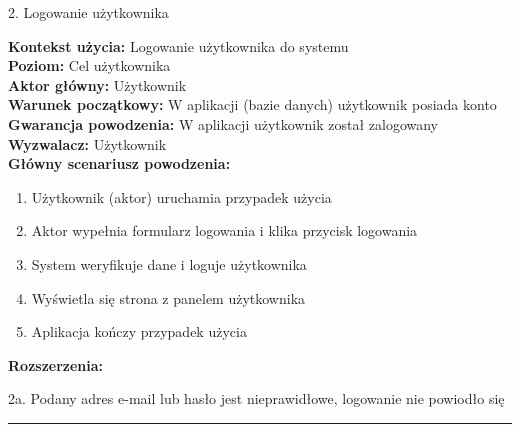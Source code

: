 {\noindent \bf{\large 2. Logowanie użytkownika\par}}
\vspace{0.5cm}
{\noindent \bf Kontekst użycia: } Logowanie użytkownika do systemu\\
{\bf Poziom: } Cel użytkownika\\
{\bf Aktor główny: } Użytkownik\\
{\bf Warunek początkowy: } W aplikacji (bazie danych) użytkownik posiada konto\\
{\bf Gwarancja powodzenia: } W aplikacji użytkownik został zalogowany\\
{\bf Wyzwalacz: } Użytkownik\\
{\bf Główny scenariusz powodzenia: }
\begin{center}
    \begin{enumerate}
        \item Użytkownik (aktor) uruchamia przypadek użycia
        \item Aktor wypełnia formularz logowania i klika przycisk logowania
        \item System weryfikuje dane i loguje użytkownika
        \item Wyświetla się strona z panelem użytkownika
        \item Aplikacja kończy przypadek użycia
    \end{enumerate}
\end{center}
{\noindent \bf Rozszerzenia: }
\begin{center}
    \begin{description}
        \item{2a.} Podany adres e-mail lub hasło jest nieprawidłowe, logowanie nie powiodło się
    \end{description}
\end{center}

\noindent\rule{14cm}{0.1pt} %

